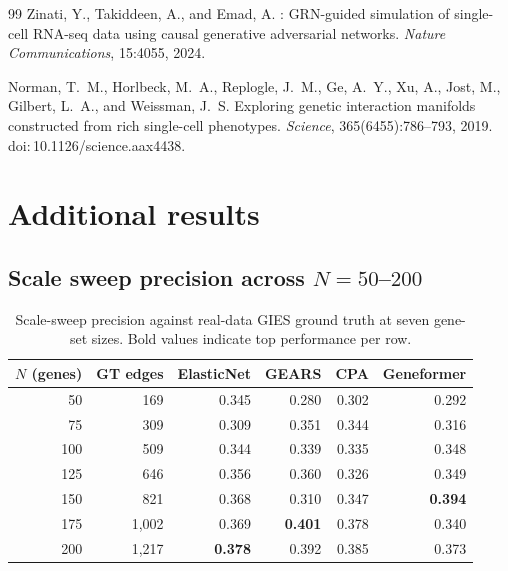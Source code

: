 \documentclass{article}
\theoremstyle{plain}
\theoremstyle{definition}
\theoremstyle{remark}
\begin{document}
\begin{thebibliography}{99}
Zinati, Y., Takiddeen, A., and Emad, A.
: {GRN}-guided simulation of single-cell {RNA}-seq data using causal generative adversarial networks.
\newblock \emph{Nature Communications}, 15:4055, 2024.

Norman, T.~M., Horlbeck, M.~A., Replogle, J.~M., Ge, A.~Y., Xu, A., Jost, M., Gilbert, L.~A., and Weissman, J.~S.
\newblock Exploring genetic interaction manifolds constructed from rich single-cell phenotypes.
\newblock \emph{Science}, 365(6455):786--793, 2019. doi:\,10.1126/science.aax4438.

\end{thebibliography}

\newpage
\appendix
\onecolumn

\section{Additional results}

\subsection{Scale sweep precision across $N{=}50$--$200$}

\begin{table}[h]
\centering
\small
\begin{tabular}{rrrrrr}
\toprule
\textbf{$N$ (genes)} & \textbf{GT edges} & \textbf{ElasticNet} & \textbf{GEARS} & \textbf{CPA} & \textbf{Geneformer} \\
\midrule
50  & 169   & 0.345 & 0.280 & 0.302 & 0.292 \\
75  & 309   & 0.309 & 0.351 & 0.344 & 0.316 \\
100 & 509   & 0.344 & 0.339 & 0.335 & 0.348 \\
125 & 646   & 0.356 & 0.360 & 0.326 & 0.349 \\
150 & 821   & 0.368 & 0.310 & 0.347 & \textbf{0.394} \\
175 & 1{,}002 & 0.369 & \textbf{0.401} & 0.378 & 0.340 \\
200 & 1{,}217 & \textbf{0.378} & 0.392 & 0.385 & 0.373 \\
\bottomrule
\end{tabular}
\caption{Scale-sweep precision against real-data GIES ground truth at seven gene-set sizes. Bold values indicate top performance per row.}
\end{table}
\end{document}
